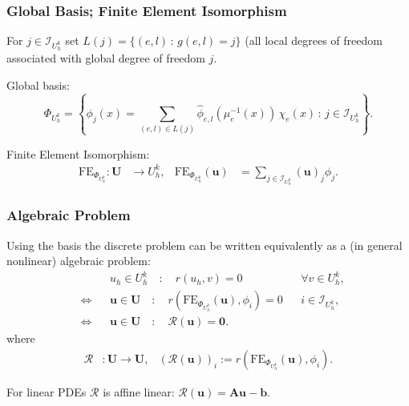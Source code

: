 \begin{frame}
\frametitle{Global Basis; Finite Element Isomorphism}
For $j\in \mathcal{I}_{U_h^k}$ set $L(j) = \{ (e,l) \, : \, g(e,l) = j\}$ (all local degrees 
of freedom associated with global degree of freedom $j$.

Global basis:
\begin{equation*}
\Phi_{U_h^k} = \left\{ \phi_j(x) = \sum_{(e,l)\in L(j)} \hat{\phi}_{e,l}(\mu_e^{-1}(x)) \, \chi_e(x) 
\, : \, j \in \mathcal{I}_{U_h^k} \right\}.
\end{equation*}

Finite Element Isomorphism:
\begin{align*}
\text{FE}_{\Phi_{U_h^k}} : \mathbf{U} &\to U_h^k, &
\text{FE}_{\Phi_{U_h^k}}(\mathbf{u}) &= \sum_{j\in \mathcal{I}_{U_h^k}} (\mathbf{u})_j \phi_j.
\end{align*}
\end{frame}

\begin{frame}
\frametitle{Algebraic Problem}
Using the basis the discrete problem can be written equivalently as a (in general nonlinear) algebraic problem:
\begin{align*}
&&& u_h \in U_h^k \quad : \quad r(u_h,v) = 0 && \forall v \in U_h^k,\\
&\Leftrightarrow && \mathbf{u}\in\mathbf{U} \quad : \quad
r\left(\text{FE}_{\Phi_{U_h^k}}(\mathbf{u}),\phi_i\right) = 0 &&
i\in\mathcal{I}_{U_h^k}, \\
&\Leftrightarrow && \mathbf{u}\in\mathbf{U} \quad : \quad
\mathcal{R}(\mathbf{u}) = \mathbf{0}.
\end{align*}
where
\begin{align*}
\mathcal{R} &: \mathbf{U} \to \mathbf{U}, &
\left(\mathcal{R}(\mathbf{u}) \right)_i :=  r\left(\text{FE}_{\Phi_{U_h^k}}(\mathbf{u}),\phi_i\right) .
\end{align*}

For linear PDEs $\mathcal{R}$ is affine linear: $\mathcal{R}(\mathbf{u}) = \mathbf{A} \mathbf{u} - \mathbf{b}$.
\end{frame}

